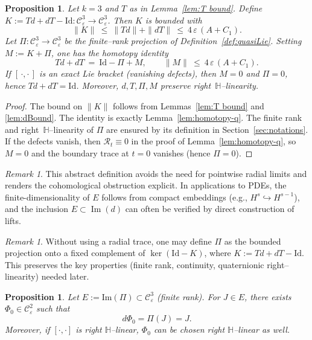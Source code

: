 \documentclass[10pt]{amsart}
\numberwithin{equation}{section}
\newtheorem{prop}[theorem]{Proposition}
\theoremstyle{remark}
\newtheorem{rmk}[theorem]{Remark}
\theoremstyle{definition}
\begin{document}
\begin{prop}\label{prop:Td+dT}
Let $k=3$ and $T$ as in Lemma~\ref{lem:T bound}. Define $K := T d + dT - \mathrm{Id} : \mathcal C_\varepsilon^3 \to \mathcal C_\varepsilon^3$.
Then $K$ is bounded with
\[
\|K\|\ \le\ \|Td\|+\|dT\|\ \le\ 4\,\varepsilon\,(A+C_1).
\]
Let $\Pi:\mathcal C_\varepsilon^3\to \mathcal C_\varepsilon^3$ be the finite–rank projection of Definition~\ref{def:quasiLie}. Setting $M:=K+\Pi$, one has the homotopy identity
\[
T d + dT \ =\ \mathrm{Id} - \Pi + M,
\qquad \|M\|\ \le\ 4\,\varepsilon\,(A+C_1).
\]
If $[\,\cdot,\cdot\,]$ is an exact Lie bracket (vanishing defects), then $M=0$ and $\Pi=0$, hence $T d + dT=\mathrm{Id}$.
Moreover, $d,T,\Pi,M$ preserve right~$\mathbb H$--linearity.
\end{prop}

\begin{proof}
The bound on $\|K\|$ follows from Lemmas~\ref{lem:T bound} and \ref{lem:dBound}.
The identity is exactly Lemma~\ref{lem:homotopy-q}. The finite rank and right~$\mathbb H$--linearity of $\Pi$ are ensured by its definition in Section~\ref{sec:notations}. If the defects vanish, then $\mathcal R_t\equiv0$ in the proof of Lemma~\ref{lem:homotopy-q}, so $M=0$ and the boundary trace at $t=0$ vanishes (hence $\Pi=0$).
\end{proof}



\begin{rmk}\label{rmk:Pi}
This abstract definition avoids the need for pointwise radial limits and renders the cohomological obstruction explicit. In applications to PDEs, the finite-dimensionality of \(E\) follows from compact embeddings (e.g., \(H^s \hookrightarrow H^{s-1}\)), and the inclusion \(E \subset \operatorname{Im}(d)\) can often be verified by direct construction of lifts.
\end{rmk}

\begin{rmk}\label{rmk:Pi-abstract}
Without using a radial trace, one may define $\Pi$ as the bounded projection onto a fixed
complement of $\ker(\mathrm{Id}-K)$, where $K:=Td+dT-\mathrm{Id}$. This preserves the key
properties (finite rank, continuity, quaternionic right--linearity) needed later.
\end{rmk}

\begin{prop}\label{prop:Phi0}
Let $E:=\mathrm{Im}(\Pi)\subset \mathcal C^3_\varepsilon$ (finite rank).
For $J\in E$, there exists $\Phi_0\in\mathcal C^2_\varepsilon$ such that
\[
d\Phi_0=\Pi(J)=J.
\]
Moreover, if $[\cdot,\cdot]$ is right $\mathbb H$--linear, $\Phi_0$ can be chosen
right $\mathbb H$--linear as well.
\end{prop}
\end{document}
